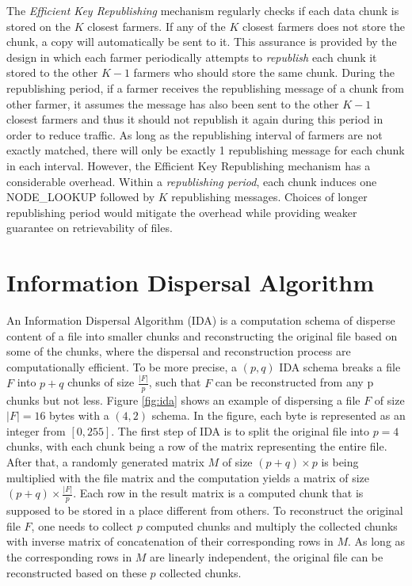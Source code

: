 The \textit{Efficient Key Republishing} mechanism regularly checks if each data chunk is stored on the $K$ closest farmers. If any of the $K$ closest farmers does not store the chunk, a copy will automatically be sent to it. This assurance is provided by the design in which each farmer periodically attempts to \textit{republish} each chunk it stored to the other $K-1$ farmers who should store the same chunk. During the republishing period, if a farmer receives the republishing message of a chunk from other farmer, it assumes the message has also been sent to the other $K-1$ closest farmers and thus it should not republish it again during this period in order to reduce traffic. As long as the republishing interval of farmers are not exactly matched, there will only be exactly 1 republishing message for each chunk in each interval. However, the Efficient Key Republishing mechanism has a considerable overhead. Within a \textit{republishing period}, each chunk induces one NODE\_LOOKUP followed by $K$ republishing messages. Choices of longer republishing period would mitigate the overhead while providing weaker guarantee on retrievability of files.

\newpage

\section{Information Dispersal Algorithm}
\label{s:informationdispersalalgorithm}

An Information Dispersal Algorithm (IDA)\cite{rabin1989efficient} is a computation schema of disperse content of a file into smaller chunks and reconstructing the original file based on some of the chunks, where the dispersal and reconstruction process are computationally efficient. To be more precise, a $(p,q)$ IDA schema breaks a file $F$ into $p + q$ chunks of size $\frac{|F|}{p}$, such that $F$ can be reconstructed from any p chunks but not less. Figure \ref{fig:ida} shows an example of dispersing a file $F$ of size $|F|=16$ bytes with a $(4,2)$ schema. In the figure, each byte is represented as an integer from $[0, 255]$. The first step of IDA is to split the original file into $p=4$ chunks, with each chunk being a row of the matrix representing the entire file. After that, a randomly generated matrix $M$ of size $(p+q)\times p$ is being multiplied with the file matrix and the computation yields a matrix of size $(p+q)\times \frac{|F|}{p}$. Each row in the result matrix is a computed chunk that is supposed to be stored in a place different from others. To reconstruct the original file $F$, one needs to collect $p$ computed chunks and multiply the collected chunks with inverse matrix of concatenation of their corresponding rows in $M$. As long as the corresponding rows in $M$ are linearly independent, the original file can be reconstructed based on these $p$ collected chunks.

